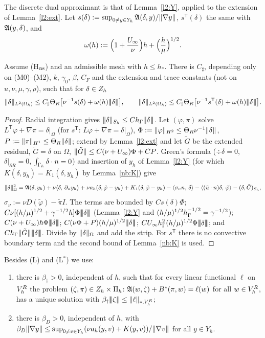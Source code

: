 The discrete dual approximant is that of Lemma~\ref{l2:Y}, applied to the extension of Lemma~\ref{l2:ext}. Let $s(\delta):=\sup_{0\ne y\in Y_h}\mathfrak A(\delta,y)/\lVert \nabla y\rVert$, $s^{\mathsf T}(\delta)$ the same with $\mathfrak A(y,\delta)$, and
\[
\omega(h):=\Bigl(1+\frac{U_\infty}\nu\Bigr)h+\Bigl(\frac h\mu\Bigr)^{1/2}.
\]

\begin{lemma}\label{n2:dual}
Assume (H$_{\rm ns}$) and an admissible mesh with $h\le h_\ast$. There is $C_\sharp$, depending only on (M0)--(M2), $k$, $\gamma_0$, $\beta$, $C_F$ and the extension and trace constants (not on $u,\nu,\mu,\gamma,\rho$), such that for $\delta\in Z_h$
\[
\norm\delta_{L^2(\Oh)}\le C_\sharp\Theta_R\bigl[\nu^{-1}s(\delta)+\omega(h)\tnorm\delta\bigr],\qquad
\norm\delta_{L^2(\Oh)}\le C_\sharp\Theta_R\bigl[\nu^{-1}s^{\mathsf T}(\delta)+\omega(h)\tnorm\delta\bigr].
\]
\end{lemma}

\begin{proof}
Radial integration gives $\lVert \delta\rVert_{S_h}\le Ch_\Gamma|\!|\!|\delta|\!|\!|$. Let $(\varphi,\pi)$ solve $L^{\mathsf T}\varphi+\nabla\pi=\delta|_\Omega$ (for $s^{\mathsf T}$: $L\varphi+\nabla\pi=\delta|_\Omega$), $\Phi:=\lVert \varphi\rVert_{H^2}\le\Theta_R\nu^{-1}\lVert \delta\rVert$, $P:=\lVert \pi\rVert_{H^1}\le\Theta_R\lVert \delta\rVert$; extend by Lemma~\ref{l2:ext} and let $\tilde G$ be the extended residual, $\tilde G=\delta$ on $\Omega$, $\lVert \tilde G\rVert\le C(\nu+U_\infty)\Phi+CP$. Green's formula ($\div\delta=0$, $\delta|_{\partial R}=0$, $\int_{\Gamma_h}\delta\cdot n=0$) and insertion of $y_h$ of Lemma~\ref{l2:Y} (for which $K(\delta,y_h)=K_1(\delta,y_h)$ by Lemma~\ref{nb:K}) give
\[
\lVert \delta\rVert^2_\Omega=\mathfrak A(\delta,y_h)+\nu\langle \delta,\, \partial_n y_h\rangle+\nu a_h(\delta,\tilde\varphi-y_h)+K_1(\delta,\tilde\varphi-y_h)-\langle \sigma_\nu n,\, \delta\rangle-\langle (\tilde u\cdot n)\delta,\, \tilde\varphi\rangle-(\delta,\tilde G)_{S_h},
\]
$\sigma_\nu:=\nu D(\tilde\varphi)-\tilde\pi I$. The terms are bounded by $C s(\delta)\Phi$; $C\nu[(h/\mu)^{1/2}+\gamma^{-1/2}h]\Phi|\!|\!|\delta|\!|\!|$ (Lemma~\ref{l2:Y} and $(h/\mu)^{1/2}h_\Gamma^{-1/2}=\gamma^{-1/2}$); $C(\nu+U_\infty)h\Phi|\!|\!|\delta|\!|\!|$; $C(\nu\Phi+P)(h/\mu)^{1/2}|\!|\!|\delta|\!|\!|$; $CU_\infty h_\Gamma^2(h/\mu)^{1/2}\Phi|\!|\!|\delta|\!|\!|$; and $Ch_\Gamma\lVert \tilde G\rVert|\!|\!|\delta|\!|\!|$. Divide by $\lVert \delta\rVert_\Omega$ and add the strip. For $s^{\mathsf T}$ there is no convective boundary term and the second bound of Lemma~\ref{nb:K} is used.
\end{proof}

Besides (L) and (L$^\ast$) we use:
\begin{enumerate}
\item[(L$^\dagger$)] there is $\beta_\dagger>0$, independent of $h$, such that for every linear functional $\ell$ on $V_h^R$ the problem $(\zeta,\pi)\in Z_h\times\Pi_h$: $\mathfrak A(w,\zeta)+B^\ast(\pi,w)=\ell(w)$ for all $w\in V_h^R$, has a unique solution with $\beta_\dagger|\!|\!|\zeta|\!|\!|\le\lVert \ell\rVert_{\ast,V_h^R}$;
\item[(L$_D$)] there is $\beta_D>0$, independent of $h$, with $\beta_D\lVert \nabla y\rVert\le\sup_{0\ne v\in Y_h}(\nu a_h(y,v)+K(y,v))/\lVert \nabla v\rVert$ for all $y\in Y_h$.
\end{enumerate}

